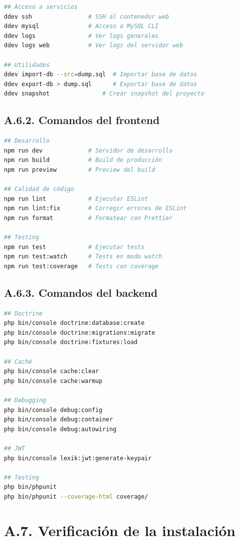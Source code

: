 \documentclass[12pt,a4paper,oneside]{report}
\begin{document}
{\begin{lstlisting}[language=bash]
## Acceso a servicios
ddev ssh                # SSH al contenedor web
ddev mysql              # Acceso a MySQL CLI
ddev logs               # Ver logs generales
ddev logs web           # Ver logs del servidor web

## Utilidades
ddev import-db --src=dump.sql  # Importar base de datos
ddev export-db > dump.sql      # Exportar base de datos
ddev snapshot               # Crear snapshot del proyecto
\end{lstlisting}

\subsection{A.6.2. Comandos del
frontend}\label{a.6.2.-comandos-del-frontend}

\begin{lstlisting}[language=bash]
## Desarrollo
npm run dev             # Servidor de desarrollo
npm run build           # Build de producción
npm run preview         # Preview del build

## Calidad de código
npm run lint            # Ejecutar ESLint
npm run lint:fix        # Corregir errores de ESLint
npm run format          # Formatear con Prettier

## Testing
npm run test            # Ejecutar tests
npm run test:watch      # Tests en modo watch
npm run test:coverage   # Tests con coverage
\end{lstlisting}

\subsection{A.6.3. Comandos del
backend}\label{a.6.3.-comandos-del-backend}

\begin{lstlisting}[language=bash]
## Doctrine
php bin/console doctrine:database:create
php bin/console doctrine:migrations:migrate
php bin/console doctrine:fixtures:load

## Caché
php bin/console cache:clear
php bin/console cache:warmup

## Debugging
php bin/console debug:config
php bin/console debug:container
php bin/console debug:autowiring

## JWT
php bin/console lexik:jwt:generate-keypair

## Testing
php bin/phpunit
php bin/phpunit --coverage-html coverage/
\end{lstlisting}

\section{A.7. Verificación de la
instalación}\label{a.7.-verificaciuxf3n-de-la-instalaciuxf3n}

}
\end{document}
